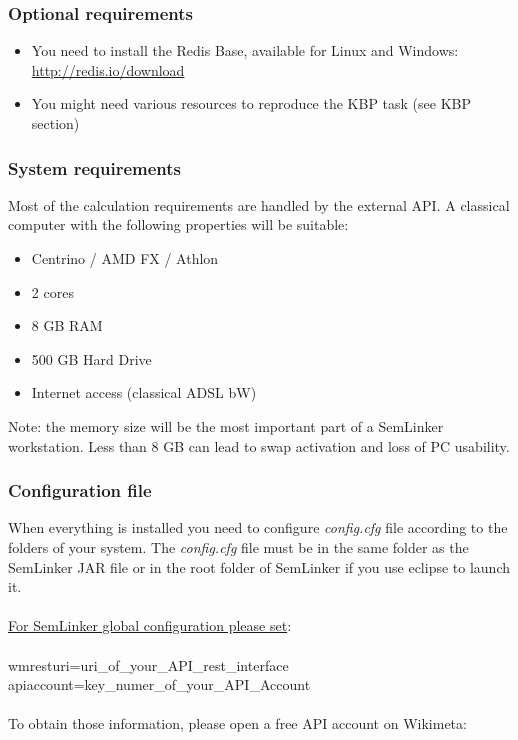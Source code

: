 \documentclass[11pt]{article}
\newcommand{\seml}{SemLinker}
\begin{document}
\subsubsection{Optional requirements}
\label{sssec:optreqs}
\begin{itemize}
 \item You need to install the Redis Base, available for Linux and Windows: \url{http://redis.io/download}
 \item You might need various resources to reproduce the KBP task (see KBP section)
\end{itemize}

\subsubsection{System requirements}
\label{sssec:sysreqs}
Most of the calculation requirements are handled by the external API. 
A classical computer with the following properties will be suitable:
\begin{itemize}
 \item Centrino / AMD FX / Athlon
 \item 2 cores
 \item 8 GB RAM
 \item 500 GB Hard Drive
 \item Internet access (classical ADSL bW)
 \end{itemize}

\noindent Note: the memory size will be the most important part of a \seml{} workstation. 
Less than 8 GB can lead to swap activation and loss of PC usability. 

\subsubsection{Configuration file}
\label{sssec:cfg}
When everything is installed you need to configure \textit{config.cfg} file according to the folders of your system. 
The \textit{config.cfg} file must be in the same folder as the \seml{} JAR file or in the root folder of \seml{} if you use eclipse to launch it.\\
\\
\underline{For \seml{} global configuration please set}:\\
\\
wmresturi=uri\_of\_your\_API\_rest\_interface\\
apiaccount=key\_numer\_of\_your\_API\_Account\\
\\
To obtain those information, please open a free API account on Wikimeta:
\end{document}
